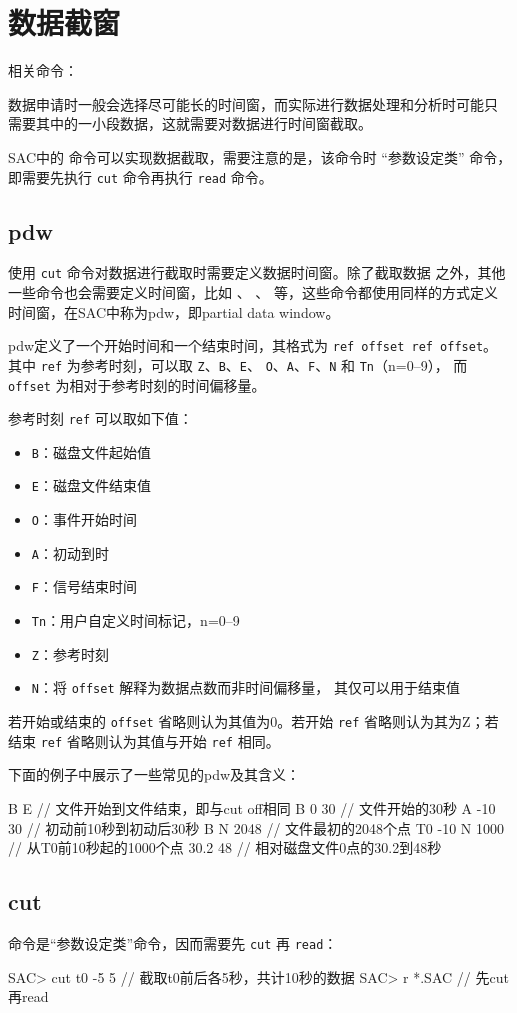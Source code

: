 \section{数据截窗}
相关命令：

数据申请时一般会选择尽可能长的时间窗，而实际进行数据处理和分析时可能只
需要其中的一小段数据，这就需要对数据进行时间窗截取。

SAC中的  命令可以实现数据截取，需要注意的是，该命令时
``参数设定类'' 命令，即需要先执行 \texttt{cut} 命令再执行 
\texttt{read} 命令。

\subsection{pdw}
\label{subsec:pdw}
使用 \texttt{cut} 命令对数据进行截取时需要定义数据时间窗。除了截取数据
之外，其他一些命令也会需要定义时间窗，比如 、
、 等，这些命令都使用同样的方式定义
时间窗，在SAC中称为pdw，即partial data window。

pdw定义了一个开始时间和一个结束时间，其格式为 \texttt{ref offset ref offset}。
其中 \texttt{ref} 为参考时刻，可以取 \texttt{Z}、\texttt{B}、\texttt{E}、
\texttt{O}、\texttt{A}、\texttt{F}、\texttt{N} 和 \texttt{Tn}（n=0--9），
而 \texttt{offset} 为相对于参考时刻的时间偏移量。

参考时刻 \texttt{ref} 可以取如下值：
\begin{itemize}
\item \texttt{B}：磁盘文件起始值
\item \texttt{E}：磁盘文件结束值
\item \texttt{O}：事件开始时间
\item \texttt{A}：初动到时
\item \texttt{F}：信号结束时间
\item \texttt{Tn}：用户自定义时间标记，n=0--9
\item \texttt{Z}：参考时刻
\item \texttt{N}：将 \texttt{offset} 解释为数据点数而非时间偏移量，
    其仅可以用于结束值
\end{itemize}

若开始或结束的 \texttt{offset} 省略则认为其值为0。若开始 \texttt{ref} 
省略则认为其为Z；若结束 \texttt{ref} 省略则认为其值与开始 \texttt{ref}
相同。

下面的例子中展示了一些常见的pdw及其含义：
\begin{SACCode}
 B E            // 文件开始到文件结束，即与cut off相同
 B 0 30         // 文件开始的30秒
 A -10 30       // 初动前10秒到初动后30秒
 B N 2048       // 文件最初的2048个点
 T0 -10 N 1000  // 从T0前10秒起的1000个点
 30.2 48        // 相对磁盘文件0点的30.2到48秒
\end{SACCode}

\subsection{cut}
 命令是``参数设定类''命令，因而需要先 \texttt{cut} 再 
\texttt{read}：
\begin{SACCode}
SAC> cut t0 -5 5        // 截取t0前后各5秒，共计10秒的数据
SAC> r *.SAC            // 先cut再read
\end{SACCode}
